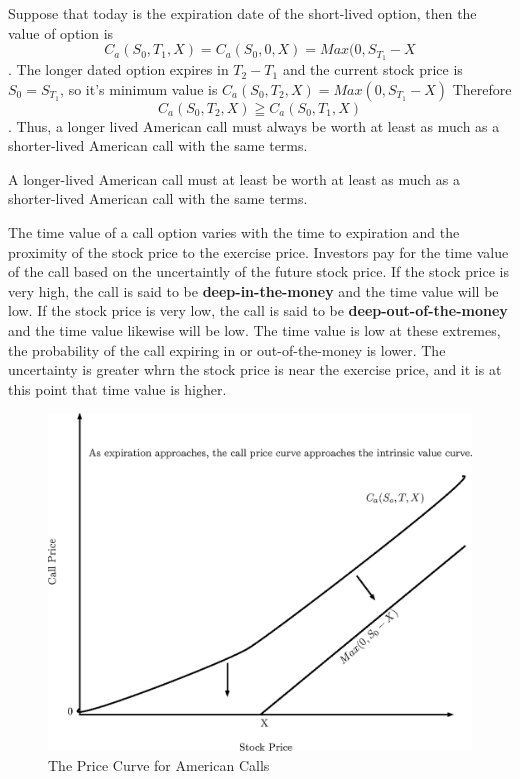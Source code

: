 \documentclass{book}
\theoremstyle{definition}
\theoremstyle{remark}
\begin{document}
            Suppose that today is the expiration date of the short-lived option, then the value of option is $$ C_a(S_0,T_1,X) = C_a(S_0, 0, X) = Max(0, S_{T_1}-X$$. The longer dated option expires in $T_2 - T_1$ and the current stock price is $S_0 = S_{T_1}$, so it's minimum value is  $C_a(S_0, T_2, X) = Max(0, S_{T_1}-X)$ Therefore $$ C_a(S_0, T_2, X) \geqq C_a(S_0, T_1, X) $$. Thus, a longer lived American call must always be worth at least as much as a shorter-lived American call with the same terms. 
            
        \begin{tcolorbox}[colback=blue!5!white,colframe=blue!75!black, title=Sticky Note]
            A longer-lived American call must at least be worth at least as much as a shorter-lived American call with the same terms. 
        \end{tcolorbox}              
            
            The time value of a call option varies with the time to expiration and the proximity  of the stock price to the exercise price. Investors pay for the time value of the call based on the uncertaintly of the future stock price. If the stock price is very high, the call is said to be \textbf{deep-in-the-money} and the time value will be low. If the stock price is very low, the call is said to be \textbf{deep-out-of-the-money} and the time value likewise will be low. The time value is low at these extremes, the probability of the call expiring in or out-of-the-money is lower. The uncertainty is greater whrn the stock price is near the exercise price, and it is at this point that time value is higher. 
            
                \begin{figure}[h]
                    \centering
                        \includegraphics[scale=0.65]{images/fig:ACallExp.eps}
                    \caption{The Price Curve for American Calls}
                    \label{fig:ACallExp}                
                \end{figure}
            
\end{document}
